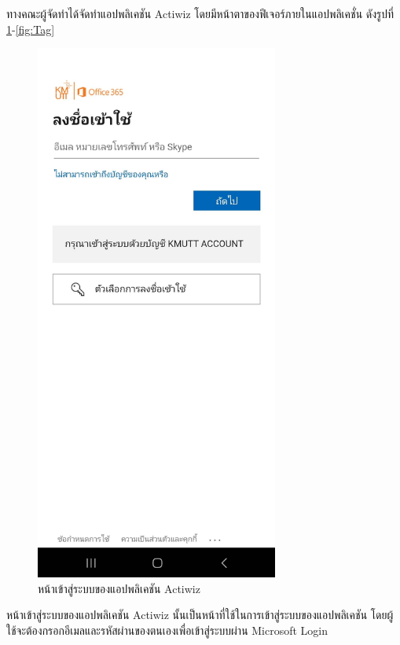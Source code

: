\documentclass[14pt,oneside,openright,a4paper]{cpe-thai-project}
\begin{document}





\hspace*{1cm} ทางคณะผู้จัดทำได้จัดทำแอปพลิเคชัน Actiwiz โดยมีหน้าตาของฟีเจอร์ภายในแอปพลิเคชั่น ดังรูปที่ \ref{fig:LoginPage}-\ref{fig:Tag}


\begin{figure}[!h]\centering
  \includegraphics[width=8cm]{./Pictures/LoginPage.jpg}
  \caption{หน้าเข้าสู่ระบบของแอปพลิเคชัน Actiwiz}\label{fig:LoginPage}
\end{figure}
  \hspace*{1cm} หน้าเข้าสู่ระบบของแอปพลิเคชัน Actiwiz นั้นเป็นหน้าที่ใช้ในการเข้าสู่ระบบของแอปพลิเคชัน โดยผู้ใช้จะต้องกรอกอีเมลและรหัสผ่านของตนเองเพื่อเข้าสู่ระบบผ่าน Microsoft Login
\newpage
\end{document}
